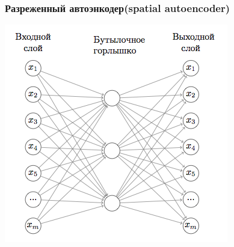 \documentclass{beamer}
\begin{document}
\begin{frame}
\frametitle{Разреженный автоэнкодер(spatial autoencoder)}
\begin{center}
	\includegraphics[width=\linewidth,height=.7\textheight,keepaspectratio]{autoencoder.png}
\end{center}
\end{frame}
\end{document}
